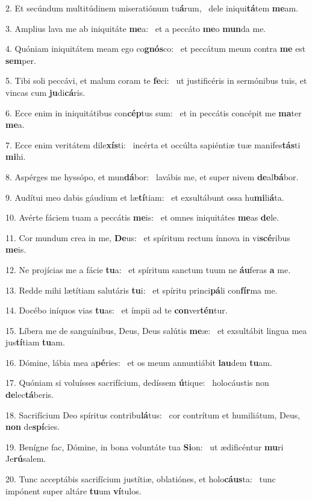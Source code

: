 2. Et secúndum multitúdinem miseratiónum tu\textbf{á}rum, \ast\  dele iniqui\textbf{tá}tem \textbf{me}am.\

3. Amplius lava me ab iniquitáte \textbf{me}a: \ast\  et a peccáto \textbf{me}o \textbf{mun}da me.\

4. Quóniam iniquitátem meam ego co\textbf{gnós}co: \ast\  et peccátum meum contra \textbf{me} est \textbf{sem}per.\

5. Tibi soli peccávi, et malum coram te \textbf{fe}ci: \ast\  ut justificéris in sermónibus tuis, et vincas cum \textbf{ju}di\textbf{cá}ris.\

6. Ecce enim in iniquitátibus con\textbf{cép}tus sum: \ast\  et in peccátis concépit me \textbf{ma}ter \textbf{me}a.\

7. Ecce enim veritátem dile\textbf{xís}ti: \ast\  incérta et occúlta sapiéntiæ tuæ manifes\textbf{tás}ti \textbf{mi}hi.\

8. Aspérges me hyssópo, et mun\textbf{dá}bor: \ast\  lavábis me, et super nivem \textbf{de}al\textbf{bá}bor.\

9. Audítui meo dabis gáudium et læ\textbf{tí}tiam: \ast\  et exsultábunt ossa hu\textbf{mi}li\textbf{á}ta.\

10. Avérte fáciem tuam a peccátis \textbf{me}is: \ast\  et omnes iniquitátes \textbf{me}as \textbf{de}le.\

11. Cor mundum crea in me, \textbf{De}us: \ast\  et spíritum rectum ínnova in vi\textbf{scé}ribus \textbf{me}is.\

12. Ne projícias me a fácie \textbf{tu}a: \ast\  et spíritum sanctum tuum ne \textbf{áu}feras \textbf{a} me.\

13. Redde mihi lætítiam salutáris \textbf{tu}i: \ast\  et spíritu princi\textbf{pá}li con\textbf{fír}ma me.\

14. Docébo iníquos vias \textbf{tu}as: \ast\  et ímpii ad te \textbf{con}ver\textbf{tén}tur.\

15. Líbera me de sanguínibus, Deus, Deus salútis \textbf{me}æ: \ast\  et exsultábit lingua mea jus\textbf{tí}tiam \textbf{tu}am.\

16. Dómine, lábia mea a\textbf{pé}ries: \ast\  et os meum annuntiábit \textbf{lau}dem \textbf{tu}am.\

17. Quóniam si voluísses sacrifícium, dedíssem \textbf{ú}tique: \ast\  holocáustis non \textbf{de}lec\textbf{tá}beris.\

18. Sacrifícium Deo spíritus contribu\textbf{lá}tus: \ast\  cor contrítum et humiliátum, Deus, \textbf{non} de\textbf{spí}cies.\

19. Benígne fac, Dómine, in bona voluntáte tua \textbf{Si}on: \ast\  ut ædificéntur \textbf{mu}ri Je\textbf{rú}salem.\

20. Tunc acceptábis sacrifícium justítiæ, oblatiónes, et holo\textbf{cáus}ta: \ast\  tunc impónent super altáre \textbf{tu}um \textbf{ví}tulos.\

